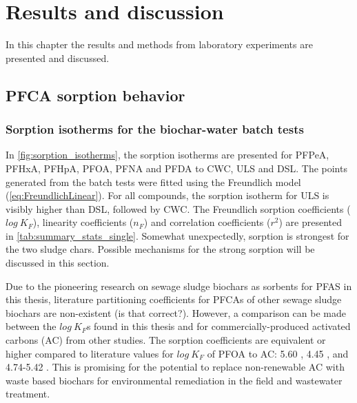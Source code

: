 \chapter{Results and discussion}\label{chap:Results&Disc}
In this chapter the results and methods from laboratory experiments are presented and discussed.

\section{PFCA sorption behavior}
\subsection{Sorption isotherms for the biochar-water batch tests}
In \cref{fig:sorption_isotherms}, the sorption isotherms are presented for PFPeA, PFHxA, PFHpA, PFOA, PFNA and PFDA to CWC, ULS and DSL. The points generated from the batch tests were fitted using the Freundlich model (\cref{eq:FreundlichLinear}). For all compounds, the sorption isotherm for ULS is visibly higher than DSL, followed by CWC. The Freundlich sorption coefficients ($log~K_F$), linearity coefficients ($n_F$) and correlation coefficients ($r^2$) are presented in \cref{tab:summary_stats_single}. Somewhat unexpectedly, sorption is strongest for the two sludge chars. Possible mechanisms for the strong sorption will be discussed in this section. 

Due to the pioneering research on sewage sludge biochars as sorbents for PFAS in this thesis, literature partitioning coefficients for PFCAs of other sewage sludge biochars are non-existent (is that correct?). However, a comparison can be made between the $log~K_F$s found in this thesis and for commercially-produced activated carbons (AC) from other studies. The sorption coefficients are equivalent or higher compared to literature values for $log~K_F$ of PFOA to AC: 5.60 \citep{Kupryianchyk2016a}, 4.45 \citep{hansen2010sorption}, and 4.74-5.42 \citep{silvani2019can}. This is promising for the potential to replace non-renewable AC with waste based biochars for environmental remediation in the field and wastewater treatment. 

